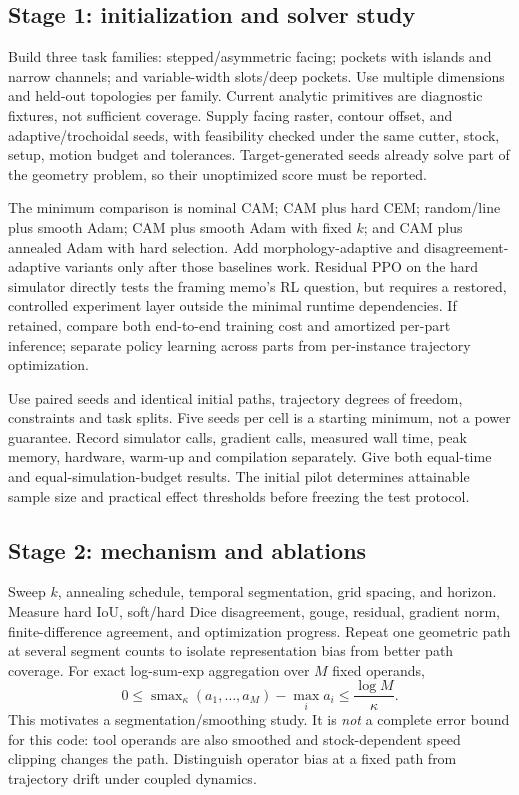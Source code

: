 \documentclass[11pt]{article}
\begin{document}
\subsection{Stage 1: initialization and solver study}
Build three task families: stepped/asymmetric facing; pockets with islands and
narrow channels; and variable-width slots/deep pockets. Use multiple dimensions
and held-out topologies per family. Current analytic primitives are diagnostic
fixtures, not sufficient coverage. Supply facing raster, contour offset, and
adaptive/trochoidal seeds, with feasibility checked under the same cutter,
stock, setup, motion budget and tolerances. Target-generated seeds already solve
part of the geometry problem, so their unoptimized score must be reported.

The minimum comparison is nominal CAM; CAM plus hard CEM; random/line plus
smooth Adam; CAM plus smooth Adam with fixed $k$; and CAM plus annealed Adam
with hard selection. Add morphology-adaptive and disagreement-adaptive variants
only after those baselines work. Residual PPO on the hard simulator directly
tests the framing memo's RL question, but requires a restored, controlled
experiment layer outside the minimal runtime dependencies. If retained, compare
both end-to-end training cost and amortized per-part inference; separate policy
learning across parts from per-instance trajectory optimization.

Use paired seeds and identical initial paths, trajectory degrees of freedom,
constraints and task splits. Five seeds per cell is a starting minimum, not a
power guarantee. Record simulator calls, gradient calls, measured wall time,
peak memory, hardware, warm-up and compilation separately. Give both equal-time
and equal-simulation-budget results. The initial pilot determines attainable
sample size and practical effect thresholds before freezing the test protocol.

\subsection{Stage 2: mechanism and ablations}
Sweep $k$, annealing schedule, temporal segmentation, grid spacing, and horizon.
Measure hard IoU, soft/hard Dice disagreement, gouge, residual, gradient norm,
finite-difference agreement, and optimization progress. Repeat one geometric
path at several segment counts to isolate representation bias from better path
coverage. For exact log-sum-exp aggregation over $M$ fixed operands,
\begin{equation}
0\leq\operatorname{smax}_{\kappa}(a_1,\ldots,a_M)-\max_i a_i
\leq \frac{\log M}{\kappa}.
\end{equation}
This motivates a segmentation/smoothing study. It is \emph{not} a complete error
bound for this code: tool operands are also smoothed and stock-dependent speed
clipping changes the path. Distinguish operator bias at a fixed path from
trajectory drift under coupled dynamics.
\end{document}
